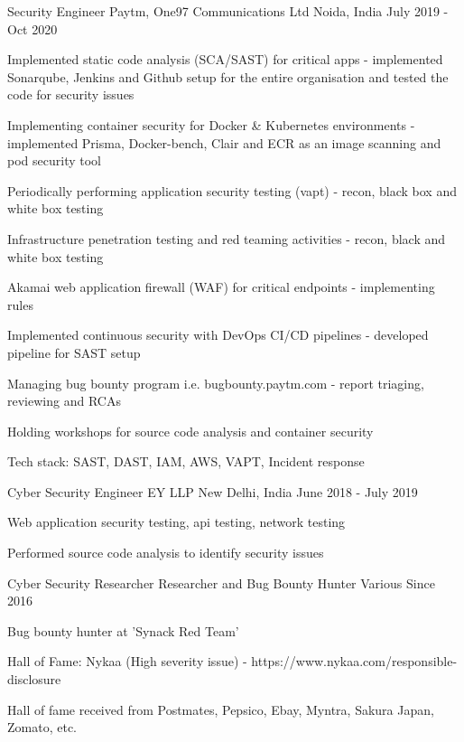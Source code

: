 \begin{cventries}
  \cventry
    {Security Engineer} %
    {Paytm, One97 Communications Ltd} %
    {Noida, India} %
    {July 2019 - Oct 2020} %
    {
      \begin{cvitems} %
        \item {Implemented static code analysis (SCA/SAST) for critical apps - implemented Sonarqube, Jenkins and Github setup for the entire organisation and tested the code for security issues}
        \item {Implementing container security for Docker \& Kubernetes environments - implemented Prisma, Docker-bench, Clair and ECR as an image scanning and pod security tool}
        \item {Periodically performing application security testing (vapt) - recon, black box and white box testing}
        \item {Infrastructure penetration testing and red teaming activities - recon, black and white box testing}
        \item {Akamai web application firewall (WAF) for critical endpoints - implementing rules}
        \item {Implemented continuous security with DevOps CI/CD pipelines - developed pipeline for SAST setup}
        \item {Managing bug bounty program i.e. bugbounty.paytm.com - report triaging, reviewing and RCAs}
        \item {Holding workshops for source code analysis and container security}
        \item {Tech stack: SAST, DAST, IAM, AWS, VAPT, Incident response}
      \end{cvitems}
    }

  \cventry
    {Cyber Security Engineer} %
    {EY LLP} %
    {New Delhi, India} %
    {June 2018 - July 2019} %
    {
      \begin{cvitems} %
        \item {Web application security testing, api testing, network testing}
        \item {Performed source code analysis to identify security issues}
      \end{cvitems}
    }

  \cventry
    {Cyber Security Researcher} %
    {Researcher and Bug Bounty Hunter} %
    {Various} %
    {Since 2016} %
    {
      \begin{cvitems} %
        \item {Bug bounty hunter at 'Synack Red Team'}
        \item {Hall of Fame: Nykaa (High severity issue) - https://www.nykaa.com/responsible-disclosure}
        \item {Hall of fame received from Postmates, Pepsico, Ebay, Myntra, Sakura Japan, Zomato, etc.}
      \end{cvitems}
    }

\end{cventries}
